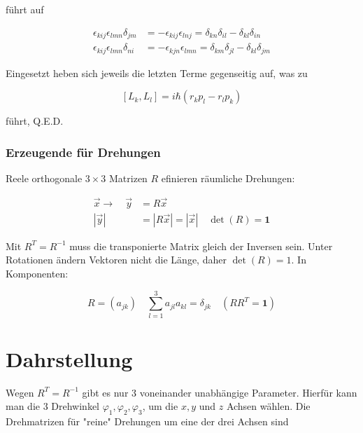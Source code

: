 \documentclass[10pt, letterpaper]{article}
\begin{document}
führt auf

$$
\begin{aligned}
\epsilon_{k i j} \epsilon_{l m n} \delta_{j m} & =-\epsilon_{k i j} \epsilon_{l n j}=\delta_{k n} \delta_{i l}-\delta_{k l} \delta_{i n} \\
\epsilon_{k i j} \epsilon_{l m n} \delta_{n i} & =-\epsilon_{k j n} \epsilon_{l m n}=\delta_{k m} \delta_{j l}-\delta_{k l} \delta_{j m}
\end{aligned}
$$

Eingesetzt heben sich jeweils die letzten Terme gegenseitig auf, was zu

$$
\left[L_{k}, L_{l}\right]=i \hbar\left(r_{k} p_{l}-r_{l} p_{k}\right)
$$

führt, Q.E.D.

\subsubsection*{Erzeugende für Drehungen}
Reele orthogonale $3 \times 3$ Matrizen $R$ efinieren räumliche Drehungen:

$$
\begin{aligned}
\vec{x} \rightarrow \quad \vec{y} & =R \vec{x} \\
|\vec{y}| & =|R \vec{x}|=|\vec{x}| \quad \operatorname{det}(R)=\mathbf{1}
\end{aligned}
$$

Mit $R^{T}=R^{-1}$ muss die transponierte Matrix gleich der Inversen sein. Unter Rotationen ändern Vektoren nicht die Länge, daher $\operatorname{det}(R)=1$. In Komponenten:

$$
R=\left(a_{j k}\right) \quad \sum_{l=1}^{3} a_{j l} a_{k l}=\delta_{j k} \quad\left(R R^{T}=\mathbf{1}\right)
$$

\section*{Dahrstellung}
Wegen $R^{T}=R^{-1}$ gibt es nur 3 voneinander unabhängige Parameter. Hierfür kann man die 3 Drehwinkel $\varphi_{1}, \varphi_{2}, \varphi_{3}$, um die $x, y$ und $z$ Achsen wählen. Die Drehmatrizen für "reine" Drehungen um eine der drei Achsen sind
\end{document}
